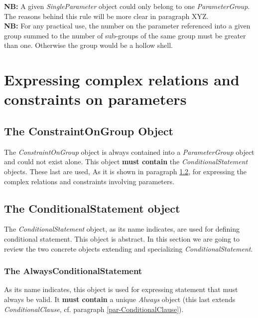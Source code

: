 \documentclass[a4paper,11pt] {article}
\begin{document}
{\bf NB:} A given {\it SingleParameter} object could only belong to one {\it ParameterGroup}. The reasons behind this rule will be more clear in paragraph XYZ.\\

{\bf NB:}  For any practical use, the number on the parameter referenced into a given group summed to the number of sub-groups of the same group must be greater than one. Otherwise the group would be a hollow shell.

\section{Expressing complex relations and constraints on parameters} 

\subsection{The ConstraintOnGroup Object}\label{par-ConstraintsOnGroup}
The {\it  ConstraintOnGroup} object is always contained into a {\it ParameterGroup} object and could not exist alone. 
This object {\bf must contain} the {\it ConditionalStatement} objects. These last are used, As it is shown in paragraph \ref{par-ConditionalStatement}, for expressing the complex relations and constraints involving parameters.

\subsection{The ConditionalStatement object}\label{par-ConditionalStatement}
The {\it ConditionalStatement} object, as its name indicates, are used for defining conditional statement. This object is abstract. In this section we are going to review the two concrete objects extending and specializing  {\it ConditionalStatement}. 

\subsubsection{The AlwaysConditionalStatement}\label{par-AlwaysConditionalStatement}
As its name indicates, this object is used for expressing statement that must always be valid. It {\bf must contain} a unique {\it Always} object (this last extends {\it ConditionalClause}, cf. paragraph \ref{par-ConditionalClause}).
\end{document}
